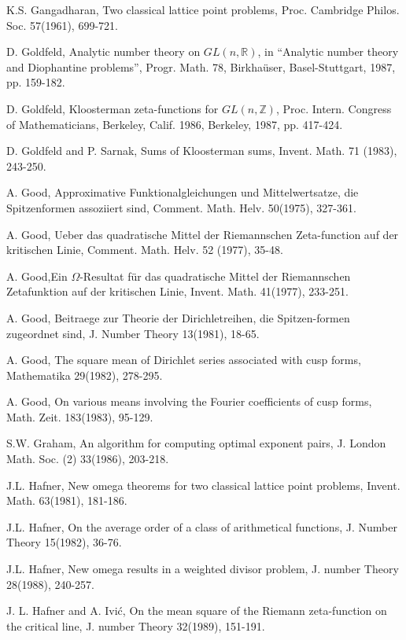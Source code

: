 \begin{thebibliography}{99}
 K.S. Gangadharan, Two classical lattice point problems, Proc. Cambridge Philos. Soc. 57(1961), 699-721.

 D. Goldfeld, Analytic number theory on $GL(n,\mathbb{R})$, in ``Analytic number theory and Diophantine problems'', Progr. Math. 78, Birkha\"user, Basel-Stuttgart, 1987, pp. 159-182.

 D. Goldfeld, Kloosterman zeta-functions for $GL(n,\mathbb{Z})$, Proc. Intern. Congress of Mathematicians, Berkeley, Calif. 1986, Berkeley, 1987, pp. 417-424. 

 D. Goldfeld and P. Sarnak, Sums of Kloosterman sums, Invent. Math. 71 (1983), 243-250.

 A. Good, Approximative Funktionalgleichungen und Mittelwertsatze, die Spitzenformen assoziiert sind, Comment. Math. Helv. 50(1975), 327-361.

 A. Good, Ueber das quadratische Mittel der Riemannschen Zeta-function auf der kritischen Linie, Comment. Math. Helv. 52 (1977), 35-48.

 A. Good,\pageoriginale Ein $\Omega$-Resultat f\"ur das quadratische Mittel der Riemannschen Zetafunktion auf der kritischen Linie, Invent. Math. 41(1977), 233-251. 

 A. Good, Beitraege zur Theorie der Dirichletreihen, die Spitzen-formen zugeordnet sind, J. Number Theory 13(1981), 18-65.

 A. Good, The square mean of Dirichlet series associated with cusp forms, Mathematika 29(1982), 278-295.

 A. Good, On various means involving the Fourier coefficients of cusp forms, Math. Zeit. 183(1983), 95-129.

 S.W. Graham, An algorithm for computing optimal exponent pairs, J. London Math. Soc. (2) 33(1986), 203-218.

 J.L. Hafner, New omega theorems for two classical lattice point problems, Invent. Math. 63(1981), 181-186.

 J.L. Hafner, On the average order of a class of arithmetical functions, J. Number Theory  15(1982), 36-76.

 J.L. Hafner, New omega results in a weighted divisor problem, J. number Theory 28(1988), 240-257.

 J. L. Hafner and A. Ivi\'c, On the mean square of the Riemann zeta-function on the critical line, J. number Theory 32(1989), 151-191.


\end{thebibliography}
